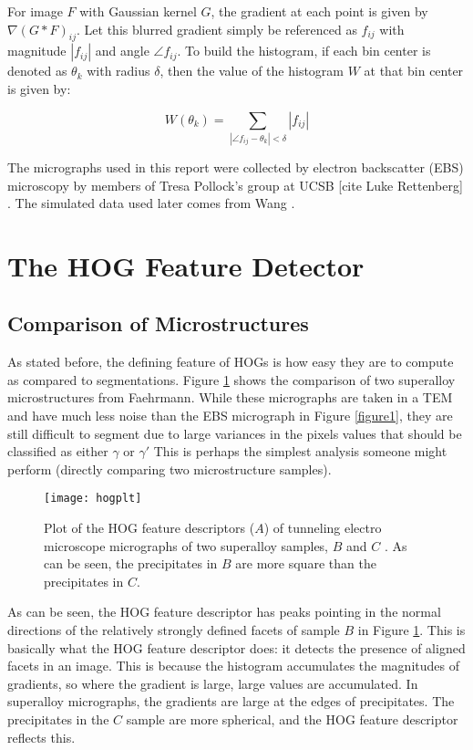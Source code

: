 \documentclass[review]{elsarticle}
\begin{document}
	For image $F$ with Gaussian kernel $G$, the gradient at each point is given by $\nabla \left( G \ast F \right)_{ij}$. Let this blurred gradient simply be referenced as $f_{ij}$ with magnitude $\left| f_{ij} \right|$ and angle $\angle f_{ij}$. To build the histogram, if each bin center is denoted as $\theta_k$ with radius $\delta$, then the value of the histogram $W$ at that bin center is given by:
	
	\begin{equation}
		W \left( \theta_k \right) = \sum_{\left| \angle f_{ij} - \theta_k \right| < \delta} \left| f_{ij} \right|
	\end{equation}

	The micrographs used in this report were collected by electron backscatter (EBS) microscopy by members of Tresa Pollock's group at UCSB [cite Luke Rettenberg] \cite{tribeam}. The simulated data used later comes from Wang \cite{ywang2}.

	\section{The HOG Feature Detector}
	\subsection{Comparison of Microstructures}
	As stated before, the defining feature of HOGs is how easy they are to compute as compared to segmentations. Figure \ref{figure2} shows the comparison of two superalloy microstructures from Faehrmann\cite{molly}. While these micrographs are taken in a TEM and have much less noise than the EBS micrograph in Figure \ref{figure1}, they are still difficult to segment due to large variances in the pixels values that should be classified as either $\gamma$ or $\gamma'$ This is perhaps the simplest analysis someone might perform (directly comparing two microstructure samples).

	\begin{figure}[!ht]
  		\centering
    	\texttt{[image: hogplt]}
  		\caption{ Plot of the HOG feature descriptors ($A$) of tunneling electro microscope micrographs of two superalloy samples, $B$ and $C$ \cite{molly}. As can be seen, the precipitates in $B$ are more square than the precipitates in $C$. }
  		\label{figure2}
	\end{figure}

	As can be seen, the HOG feature descriptor has peaks pointing in the normal directions of the relatively strongly defined facets of sample $B$ in Figure \ref{figure2}. This is basically what the HOG feature descriptor does: it detects the presence of aligned facets in an image. This is because the histogram accumulates the magnitudes of gradients, so where the gradient is large, large values are accumulated. In superalloy micrographs, the gradients are large at the edges of precipitates. The precipitates in the $C$ sample are more spherical, and the HOG feature descriptor reflects this.
	
\end{document}
